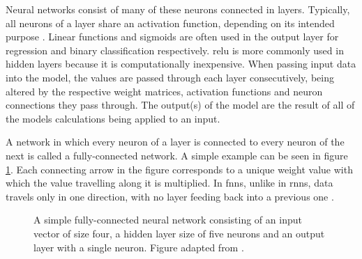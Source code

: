 Neural networks consist of many of these neurons connected in layers.
Typically, all neurons of a layer share an activation function, depending on its intended purpose \cite{Jurafsky.2024}.
Linear functions and sigmoids are often used in the output layer for regression and binary classification respectively.
\ac{relu} is more commonly used in hidden layers because it is computationally inexpensive.
When passing input data into the model, the values are passed through each layer consecutively, being altered by the respective weight matrices, activation functions and neuron connections they pass through.
The output(s) of the model are the result of all of the models calculations being applied to an input.

A network in which every neuron of a layer is connected to every neuron of the next is called a fully-connected network.
A simple example can be seen in figure \ref{fig:nn}.
Each connecting arrow in the figure corresponds to a unique weight value with which the value travelling along it is multiplied.
In \acp{fnn}, unlike in \acp{rnn}, data travels only in one direction, with no layer feeding back into a previous one \cite{Jurafsky.2024}.

\begin{figure}
    \centering
    \caption{A simple fully-connected neural network consisting of an input vector of size four, a hidden layer size of five neurons and an output layer with a single neuron. Figure adapted from \cite{Jurafsky.2024}.}
    \label{fig:nn}
\end{figure}


